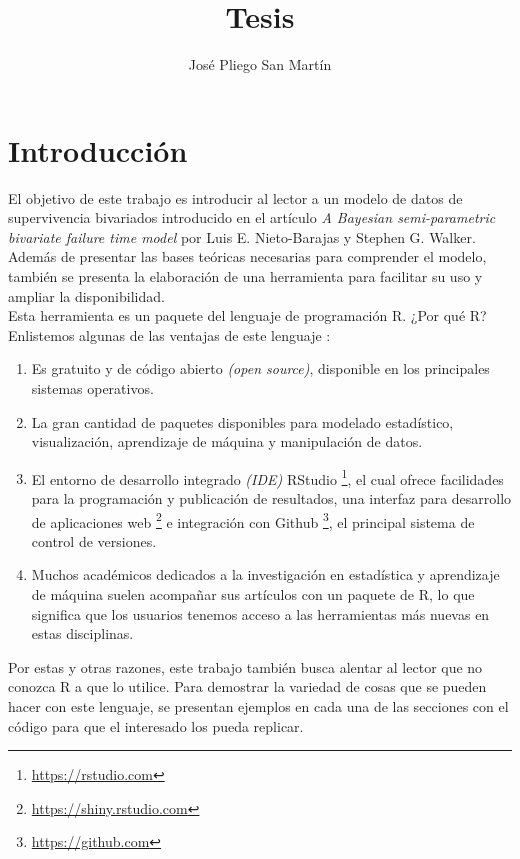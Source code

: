 \documentclass[11pt,a4paper]{article}
\author{José Pliego San Martín}
\title{Tesis}
\begin{document}
\maketitle
\tableofcontents
\listoffigures

\newpage

\setlength{\parindent}{0pt}

\section*{Introducción}

El objetivo de este trabajo es introducir al lector a un modelo de datos de supervivencia bivariados introducido en el artículo \textit{A Bayesian semi-parametric bivariate failure time model} por Luis E. Nieto-Barajas y Stephen G. Walker. Además de presentar las bases teóricas necesarias para comprender el modelo, también se presenta la elaboración de una herramienta para facilitar su uso y ampliar la disponibilidad.\\

Esta herramienta es un paquete del lenguaje de programación R. ¿Por qué R? Enlistemos algunas de las ventajas de este lenguaje \citep{advanced_r}:
\begin{enumerate}
\item Es gratuito y de código abierto \textit{(open source)}, disponible en los principales sistemas operativos.
\item La gran cantidad de paquetes disponibles para modelado estadístico, visualización, aprendizaje de máquina y manipulación de datos.
\item El entorno de desarrollo integrado \textit{(IDE)} RStudio \footnote{\url{https://rstudio.com}}, el cual ofrece facilidades para la programación y publicación de resultados, una interfaz para desarrollo de aplicaciones web \footnote{\url{https://shiny.rstudio.com}} e integración con Github \footnote{\url{https://github.com}}, el principal sistema de control de versiones.
\item Muchos académicos dedicados a la investigación en estadística y aprendizaje de máquina suelen acompañar sus artículos con un paquete de R, lo que significa que los usuarios tenemos acceso a las herramientas más nuevas en estas disciplinas.\\
\end{enumerate}

Por estas y otras razones, este trabajo también busca alentar al lector que no conozca R a que lo utilice. Para demostrar la variedad de cosas que se pueden hacer con este lenguaje, se presentan ejemplos en cada una de las secciones con el código para que el interesado los pueda replicar.\\
\end{document}

